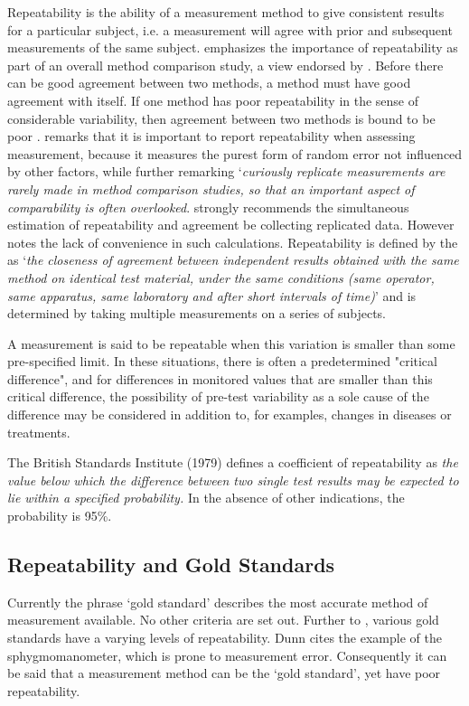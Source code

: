 \documentclass[MAIN.tex]{subfiles}
\begin{document}
Repeatability is the ability of a measurement method to give consistent results for a particular subject, i.e. a measurement will agree with prior and subsequent measurements of the same subject. \citet{Barnhart} emphasizes the importance of repeatability as part of an overall method comparison study, a view endorsed by \citet{BXC2008}. Before there can be good agreement between two methods, a method must have good agreement with itself. If one method has poor repeatability in the sense of considerable
variability, then agreement between two methods is bound to be
poor \citep{ARoy2009}. \citet{Barnhart} remarks that it is important to report repeatability when assessing
measurement, because it measures the purest form of random error
not influenced by other factors, while further remarking `\textit{curiously replicate measurements are rarely made in method comparison studies, so that an important aspect of comparability is often overlooked}. \citet{BA99} strongly recommends the simultaneous estimation of repeatability and agreement be collecting replicated data.
However \citet{ARoy2009} notes the lack of convenience in such calculations. 	Repeatability is defined by the \citet{IUPAC} as `\textit{the closeness of agreement between independent results obtained with the same method on identical test material, under the same conditions (same
	operator, same apparatus, same laboratory and after short intervals of time)}'  and is determined by taking multiple measurements on a series of subjects.




A measurement is said to be repeatable when this variation is smaller than some pre-specified limit. In these situations, there is often a predetermined "critical difference", and for differences in monitored values that are smaller than this critical difference, the possibility of pre-test variability as a sole cause of the difference may be considered in addition to, for examples, changes in diseases or treatments. 


The British Standards Institute (1979) defines a coefficient of repeatability  as \emph{the value below which the difference between two single test results may be expected to lie within a specified probability.} In the absence of other indications, the probability is 95\%.

\subsection{Repeatability and Gold Standards}
Currently the phrase `gold standard' describes the most accurate method of measurement available. No other criteria are set out. Further to \citet{dunnSEME}, various gold standards have a varying levels of repeatability. Dunn cites the example of the sphygmomanometer, which is prone to measurement error. Consequently it can be said that a measurement method can be the `gold standard', yet have poor repeatability. 
\end{document}
